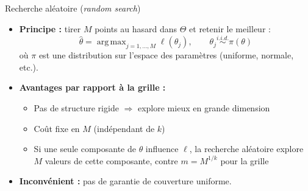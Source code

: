 \documentclass[11pt,aspectratio=169]{beamer}
\DeclareMathOperator*{\argmax}{arg\,max}
\begin{document}
\begin{frame}{Recherche aléatoire (\textit{random search})}

\begin{itemize}

\item \textbf{Principe :} tirer $M$ points au hasard dans $\Theta$ et retenir le meilleur :
  \[
  \boxed{\hat{\theta} = \argmax_{j=1,\ldots,M} \ell(\theta_j), \qquad \theta_j \overset{i.i.d.}{\sim} \pi(\theta)}
  \]
  où $\pi$ est une distribution sur l'espace des paramètres (uniforme, normale, etc.).\newline

\item \textbf{Avantages par rapport à la grille :}
  \begin{itemize}
    \item Pas de structure rigide $\Rightarrow$ explore mieux en grande dimension\newline
    \item Coût fixe en $M$ (indépendant de $k$)\newline
    \item Si une seule composante de $\theta$ influence $\ell$, la recherche aléatoire explore $M$ valeurs de cette composante, contre $m = M^{1/k}$ pour la grille\newline
  \end{itemize}

\item \textbf{Inconvénient :} pas de garantie de couverture uniforme.

\end{itemize}

\end{frame}
\end{document}

